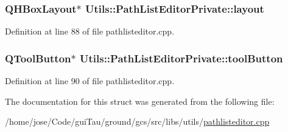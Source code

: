\hypertarget{struct_utils_1_1_path_list_editor_private_a49b0f4d77c005208d794903fbad89fba}{
\subsubsection[{layout}]{\setlength{\rightskip}{0pt plus 5cm}Q\-H\-Box\-Layout$\ast$ Utils\-::\-Path\-List\-Editor\-Private\-::layout}}\label{struct_utils_1_1_path_list_editor_private_a49b0f4d77c005208d794903fbad89fba}


Definition at line 88 of file pathlisteditor.\-cpp.

\hypertarget{struct_utils_1_1_path_list_editor_private_a885b729d9ae52f2f5eb13193cffd76e5}{
\subsubsection[{tool\-Button}]{\setlength{\rightskip}{0pt plus 5cm}Q\-Tool\-Button$\ast$ Utils\-::\-Path\-List\-Editor\-Private\-::tool\-Button}}\label{struct_utils_1_1_path_list_editor_private_a885b729d9ae52f2f5eb13193cffd76e5}


Definition at line 90 of file pathlisteditor.\-cpp.



The documentation for this struct was generated from the following file\-:\begin{DoxyCompactItemize}
\item 
/home/jose/\-Code/gui\-Tau/ground/gcs/src/libs/utils/\hyperlink{pathlisteditor_8cpp}{pathlisteditor.\-cpp}\end{DoxyCompactItemize}
